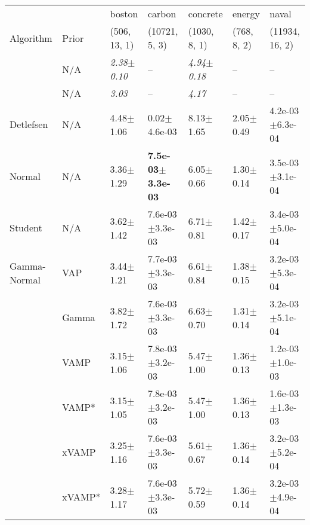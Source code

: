 \begin{tabular}{lllllll}
\toprule
                  &       &                  boston &                        carbon &                concrete &                  energy &                         naval \\
Algorithm & Prior& (506, 13, 1)& (10721, 5, 3)& (1030, 8, 1)& (768, 8, 2)& (11934, 16, 2)\\
\midrule
\citet{sun2019functional} & N/A &  \textit{2.38$\pm$0.10} &                            -- &  \textit{4.94$\pm$0.18} &                      -- &                            -- \\
\citet{sicking2021novel} & N/A &           \textit{3.03} &                            -- &           \textit{4.17} &                      -- &                            -- \\
Detlefsen & N/A &           4.48$\pm$1.06 &              0.02$\pm$4.6e-03 &           8.13$\pm$1.65 &           2.05$\pm$0.49 &           4.2e-03$\pm$6.3e-04 \\
Normal & N/A &           3.36$\pm$1.29 &  \textbf{7.5e-03$\pm$3.3e-03} &           6.05$\pm$0.66 &           1.30$\pm$0.14 &           3.5e-03$\pm$3.1e-04 \\
Student & N/A &           3.62$\pm$1.42 &           7.6e-03$\pm$3.3e-03 &           6.71$\pm$0.81 &           1.42$\pm$0.17 &           3.4e-03$\pm$5.0e-04 \\
Gamma-Normal & VAP &           3.44$\pm$1.21 &           7.7e-03$\pm$3.3e-03 &           6.61$\pm$0.84 &           1.38$\pm$0.15 &           3.2e-03$\pm$5.3e-04 \\
                  & Gamma &           3.82$\pm$1.72 &           7.6e-03$\pm$3.3e-03 &           6.63$\pm$0.70 &           1.31$\pm$0.14 &           3.2e-03$\pm$5.1e-04 \\
                  & VAMP &           3.15$\pm$1.06 &           7.8e-03$\pm$3.2e-03 &           5.47$\pm$1.00 &           1.36$\pm$0.13 &           1.2e-03$\pm$1.0e-03 \\
                  & VAMP* &           3.15$\pm$1.05 &           7.8e-03$\pm$3.2e-03 &           5.47$\pm$1.00 &           1.36$\pm$0.13 &           1.6e-03$\pm$1.3e-03 \\
                  & xVAMP &           3.25$\pm$1.16 &           7.6e-03$\pm$3.3e-03 &           5.61$\pm$0.67 &           1.36$\pm$0.14 &           3.2e-03$\pm$5.2e-04 \\
                  & xVAMP* &           3.28$\pm$1.17 &           7.6e-03$\pm$3.3e-03 &           5.72$\pm$0.59 &           1.36$\pm$0.14 &           3.2e-03$\pm$4.9e-04 \\

\end{tabular}
